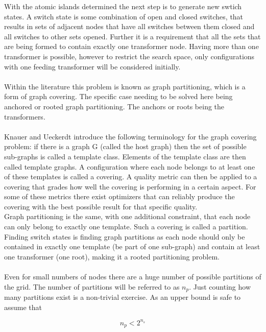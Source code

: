 With the atomic islands determined the next step is to generate new swtich states.
A switch state is some combination of open and closed switches,
that results in sets of adjacent nodes that have all switches
between them closed and all switches to other
sets opened.
Further it is a requirement that all the sets
that are being formed to contain exactly
one transformer node. Having more than one transformer is possible, however to
restrict the search space, only configurations with one feeding transformer
will be considered initially.\\
\\
Within the literature this problem is known as graph partitioning, which is a form
of graph covering. 
The specific case needing to be solved here being anchored or 
rooted graph partitioning\autocite{graph_partitioning}. The anchors
or roots being the transformers.\\
\\
Knauer and Ueckerdt\autocite{graph_covering_terminology}
introduce the following terminology for the graph covering problem:
if there is a graph G (called
the host graph) then the set of possible sub-graphs is called a template class.
Elements of the template class are then called template graphs. A configuration 
where each node belongs to at least
one of these templates is called a covering. A quality metric can then be applied to a covering
that grades how well the covering is performing in a certain aspect. For some of these metrics
there exist optimizers that can reliably produce the covering with the best possible result for that
specific quality.\\
Graph partitioning is the same, with one additional constraint, that each node can only belong
to exactly one template. Such a covering is called a partition.\\
Finding switch states is finding graph partitions as each node should only
be contained in exactly one template (be part of one sub-graph) and contain at least
one transformer (one root), making it a rooted partitioning problem.\\
\\
Even for small numbers of nodes there are a huge number of possible partitions
of the grid.
The number of partitions will be referred to as $n_p$.
Just counting how many partitions exist is a non-trivial exercise.
As an upper bound is safe
to assume that

\begin{equation}
    n_p < 2^{n_s} 
    \label{eq:sw_exp:upper_bound1}
\end{equation}

